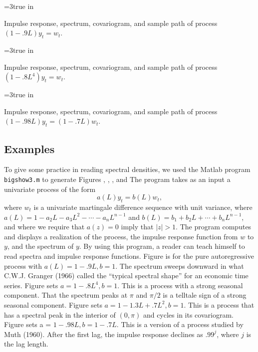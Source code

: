   \centerline{\epsfxsize=3true
in} \caption{Impulse response, spectrum,
covariogram, and sample path of process $(1 - .9L) y_t = w_t $.}
\endfigure


\centerline{\epsfxsize=3true in}
\caption{Impulse response, spectrum, covariogram, and
sample path
 of process $(1 - .8L^4) y_t = w_t $.}
\endfigure


 \centerline{\epsfxsize=3true
in} \caption{Impulse response, spectrum,
covariogram, and sample path of process $(1 - .98L) y_t =(1 - .7L)
w_t $.} 
\endfigure

\subsection{Examples}
To give some practice in reading spectral densities,
we used the Matlab program {\tt bigshow3.m}  to generate
Figures , , , and 
 The program takes as an input a univariate process of the
form
$$ a(L) y_t = b(L) w_t,$$
where $w_t$ is a univariate martingale difference sequence with
unit variance, where $a(L) = 1 - a_2 L - a_3 L^2 - \cdots - a_n
L^{n-1}$ and $b(L) = b_1 +  b_2 L + \cdots + b_n L^{n-1}$, and
where we require that $a(z)=0 $ imply that $| z | > 1$.   The
program computes and displays a realization of the process, the
impulse response function from $w$ to $y$, and the spectrum of
$y$. By using this program, a reader can teach himself to read
spectra and impulse response functions. Figure  is for the pure
autoregressive process with $a(L) = 1 -.9L, b=1$. The spectrum
sweeps downward in what C.W.J. Granger (1966) called the ``typical
spectral shape'' for an economic time series. 
 Figure  sets $a=1-.8L^4, b=1$.  This is a process with
a strong seasonal component.  That the spectrum
peaks at $\pi$ and $\pi/2$ is a  telltale sign of
a strong seasonal component. Figure  sets
$a=1 -1.3 L + .7L^2, b=1$.  This
is a process that has a spectral peak in the interior of $(0, \pi)$ and cycles in its
covariogram.
Figure  sets a = $1-.98L, b = 1 -.7L$.  This
is a version of a process studied by Muth (1960).  After the first
lag, the impulse response declines as $.99^j$, where
$j$ is the lag length.

